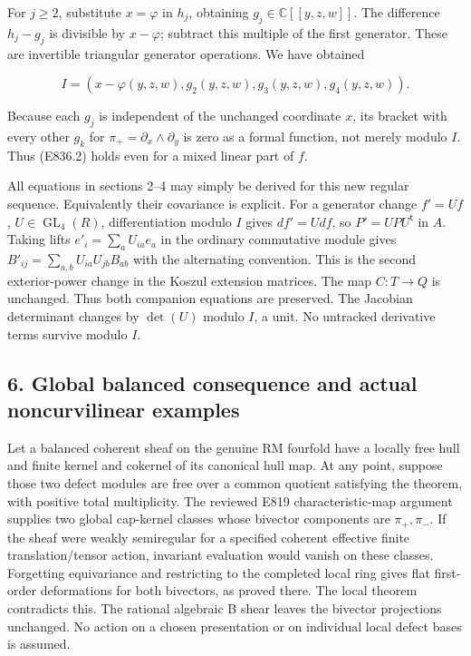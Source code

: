 For \(j\ge2\), substitute \(x=\varphi\) in \(h_j\), obtaining
\(g_j\in\mathbb C[[y,z,w]]\). The difference \(h_j-g_j\) is divisible by
\(x-\varphi\); subtract this multiple of the first generator. These are
invertible triangular generator operations. We have obtained

\[
 I=(x-\varphi(y,z,w),g_2(y,z,w),g_3(y,z,w),g_4(y,z,w)).
 \tag{E836.18}
\]

Because each \(g_j\) is independent of the unchanged coordinate \(x\),
its bracket with every other \(g_k\) for
\(\pi_+=\partial_x\wedge\partial_y\) is zero as a formal function, not
merely modulo \(I\). Thus (E836.2) holds even for a mixed linear part of
\(f\).

All equations in sections 2--4 may simply be derived for this new
regular sequence. Equivalently their covariance is explicit. For a
generator change \(f'=Uf\), \(U\in\operatorname{GL}_4(R)\),
differentiation modulo \(I\) gives \(df'=Udf\), so
\(P'=UPU^{\mathsf t}\) in \(A\). Taking lifts \(e'_i=\sum_a U_{ia}e_a\)
in the ordinary commutative module gives
\(B'_{ij}=\sum_{a,b}U_{ia}U_{jb}B_{ab}\) with the alternating
convention. This is the second exterior-power change in the Koszul
extension matrices. The map \(C:T\to Q\) is unchanged. Thus both
companion equations are preserved. The Jacobian determinant changes by
\(\det(U)\) modulo \(I\), a unit. No untracked derivative terms survive
modulo \(I\).

\subsection{6. Global balanced consequence and actual noncurvilinear
examples}\label{global-balanced-consequence-and-actual-noncurvilinear-examples}

Let a balanced coherent sheaf on the genuine RM fourfold have a locally
free hull and finite kernel and cokernel of its canonical hull map. At
any point, suppose those two defect modules are free over a common
quotient satisfying the theorem, with positive total multiplicity. The
reviewed E819 characteristic-map argument supplies two global cap-kernel
classes whose bivector components are \(\pi_+,\pi_-\). If the sheaf were
weakly semiregular for a specified coherent effective finite
translation/tensor action, invariant evaluation would vanish on these
classes. Forgetting equivariance and restricting to the completed local
ring gives flat first-order deformations for both bivectors, as proved
there. The local theorem contradicts this. The rational algebraic B
shear leaves the bivector projections unchanged. No action on a chosen
presentation or on individual local defect bases is assumed.


